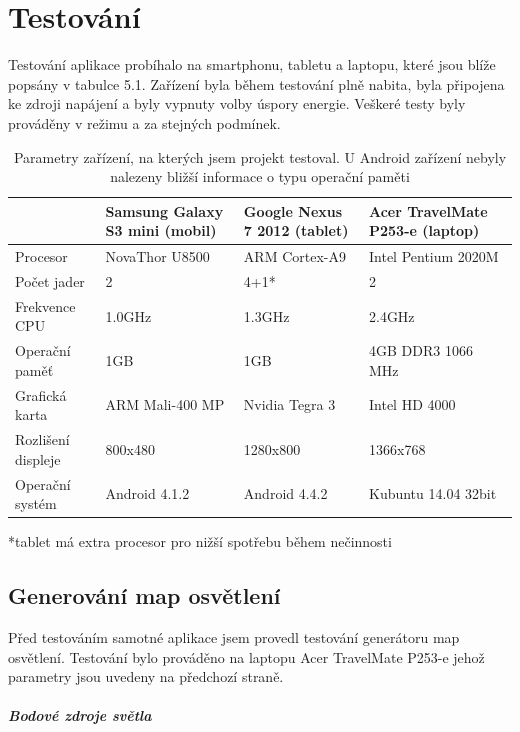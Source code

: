 \documentclass[11pt,twoside,a4paper]{book}
\begin{document}
\chapter{Testování}
Testování aplikace probíhalo na smartphonu, tabletu a laptopu, které jsou blíže popsány v tabulce 5.1. Zařízení byla během testování plně nabita, byla připojena ke zdroji napájení a byly vypnuty volby úspory energie. Veškeré testy byly prováděny v režimu  a za stejných podmínek.

\begin{table}[h!]
\begin{center}
\begin{tabular}{|p{29mm}|p{38mm}|p{38mm}|p{38mm}|}
\hline
& \textbf{Samsung Galaxy S3 mini (mobil)} & \textbf{Google Nexus 7 2012 (tablet)} & \textbf{Acer TravelMate P253-e (laptop)} \\
\hline
Procesor & NovaThor U8500 & ARM Cortex-A9 & Intel Pentium 2020M \\ \hline
Počet jader & 2 & 4+1* & 2 \\ \hline
Frekvence CPU & 1.0GHz & 1.3GHz & 2.4GHz \\ \hline
Operační paměť & 1GB & 1GB & 4GB DDR3 1066 MHz \\ \hline
Grafická karta & ARM Mali-400 MP & Nvidia Tegra 3 & Intel HD 4000 \\ \hline
Rozlišení displeje & 800x480 & 1280x800 & 1366x768 \\ \hline
Operační systém & Android 4.1.2 & Android 4.4.2 & Kubuntu 14.04 32bit \\ \hline
\end{tabular}
\caption{Parametry zařízení, na kterých jsem projekt testoval. U Android zařízení nebyly nalezeny bližší informace o typu operační paměti}
*tablet má extra procesor pro nižší spotřebu během nečinnosti
\end{center}
\end{table}
\newpage

\section{Generování map osvětlení}
Před testováním samotné aplikace jsem provedl testování generátoru map osvětlení. Testování bylo prováděno na laptopu Acer TravelMate P253-e jehož parametry jsou uvedeny na předchozí straně.

\paragraph{Bodové zdroje světla}\ \ \\
\end{document}
